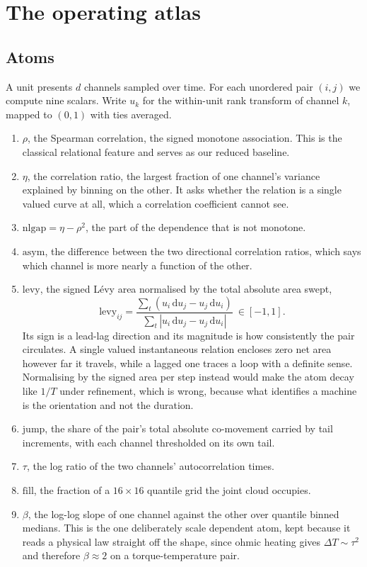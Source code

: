 \documentclass[11pt]{article}
\begin{document}
\section{The operating atlas}

\subsection{Atoms}

A unit presents $d$ channels sampled over time. For each unordered pair
$(i,j)$ we compute nine scalars. Write $u_k$ for the within-unit rank transform
of channel $k$, mapped to $(0,1)$ with ties averaged.

\begin{enumerate}
\item $\rho$, the Spearman correlation, the signed monotone association. This
is the classical relational feature and serves as our reduced baseline.
\item $\eta$, the correlation ratio, the largest fraction of one channel's
variance explained by binning on the other. It asks whether the relation is a
single valued curve at all, which a correlation coefficient cannot see.
\item $\mathrm{nlgap} = \eta - \rho^2$, the part of the dependence that is not
monotone.
\item $\mathrm{asym}$, the difference between the two directional correlation
ratios, which says which channel is more nearly a function of the other.
\item $\mathrm{levy}$, the signed L\'evy area normalised by the total absolute
area swept,
\[
\mathrm{levy}_{ij}
= \frac{\sum_t \left(u_i\,\mathrm{d}u_j - u_j\,\mathrm{d}u_i\right)}
       {\sum_t \left|u_i\,\mathrm{d}u_j - u_j\,\mathrm{d}u_i\right|}\ \in[-1,1].
\]
Its sign is a lead-lag direction and its magnitude is how consistently the pair
circulates. A single valued instantaneous relation encloses zero net area
however far it travels, while a lagged one traces a loop with a definite sense.
Normalising by the signed area per step instead would make the atom decay like
$1/T$ under refinement, which is wrong, because what identifies a machine is
the orientation and not the duration.
\item $\mathrm{jump}$, the share of the pair's total absolute co-movement
carried by tail increments, with each channel thresholded on its own tail.
\item $\tau$, the log ratio of the two channels' autocorrelation times.
\item $\mathrm{fill}$, the fraction of a $16\times16$ quantile grid the joint
cloud occupies.
\item $\beta$, the log-log slope of one channel against the other over quantile
binned medians. This is the one deliberately scale dependent atom, kept because
it reads a physical law straight off the shape, since ohmic heating gives
$\Delta T\sim\tau^2$ and therefore $\beta\approx2$ on a torque-temperature
pair.
\end{enumerate}
\end{document}
